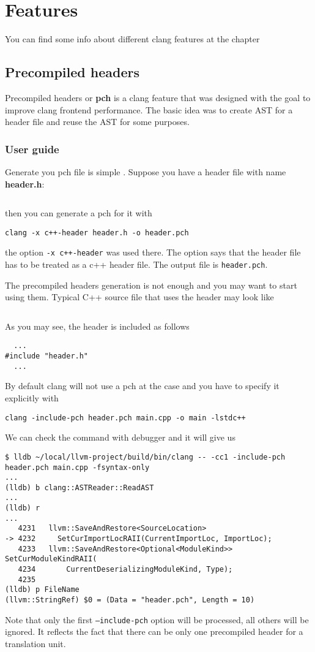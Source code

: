 \chapter{Features}

You can find some info about different clang features at the chapter

\section{Precompiled headers}
Precompiled headers or \textbf{pch} is a clang feature that was
designed with the goal to improve clang frontend performance. The
basic idea was to create AST for a header file and reuse the AST for
some purposes.

\subsection{User guide}
Generate you pch file is simple \cite{clang:user_manual}. Suppose you have a header file with
name \textbf{header.h}:
\inputminted{c++}{./src/pch/simple/header.h} then you can generate a pch for it with
\begin{verbatim}
clang -x c++-header header.h -o header.pch
\end{verbatim}
the option \texttt{-x c++-header} was used there. The option says that
the header file has to be treated as a c++ header file. The output
file is \texttt{header.pch}.

The precompiled headers generation is not enough and you may want to
start using them. Typical C++ source file that uses the header may
look like
\inputminted{c++}{./src/pch/simple/main.cpp}
As you may see, the header is included as follows
\begin{verbatim}
  ...
#include "header.h"
  ...
\end{verbatim}
By default clang will not use a pch at the case and you have to
specify it explicitly with
\begin{verbatim}
clang -include-pch header.pch main.cpp -o main -lstdc++
\end{verbatim}
We can check the command with debugger and it will give us
\begin{verbatim}
$ lldb ~/local/llvm-project/build/bin/clang -- -cc1 -include-pch header.pch main.cpp -fsyntax-only
...
(lldb) b clang::ASTReader::ReadAST                                             
...
(lldb) r
...
   4231   llvm::SaveAndRestore<SourceLocation>
-> 4232     SetCurImportLocRAII(CurrentImportLoc, ImportLoc);
   4233   llvm::SaveAndRestore<Optional<ModuleKind>> SetCurModuleKindRAII(
   4234       CurrentDeserializingModuleKind, Type);
   4235 
(lldb) p FileName
(llvm::StringRef) $0 = (Data = "header.pch", Length = 10)
\end{verbatim}
Note that only the first \texttt{--include-pch} option will be
processed, all others will be ignored. It reflects the fact that there
can be only one precompiled header for a translation unit.

